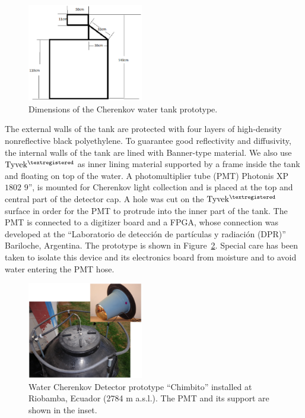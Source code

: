 \documentclass[12pt]{article}
\begin{document}
\begin{figure}[!ht]
  \centering
 \includegraphics[width=0.45\textwidth]{chimbito_dimensiones.eps}
  \caption{Dimensions of the Cherenkov water tank prototype.}
  \label{fig:tank}
 \end{figure}

The external walls of the tank are protected with four layers of
high-density nonreflective black polyethylene. To guarantee good
reflectivity and diffusivity, the internal walls of the tank are lined with
Banner-type material. We also use ${{\rm Tyvek^{\tiny \textregistered}}}$
as inner lining material supported by a frame inside the tank and floating
on top of the water. A photomultiplier tube (PMT) Photonis XP$1802$ $9$'',
is mounted for Cherenkov light collection and is placed at the top and
central part of the detector cap. A hole was cut on the ${{\rm Tyvek^{\tiny
      \textregistered}}}$ surface in order for the PMT to protrude into the inner part of the tank. The PMT is connected to a digitizer board and a FPGA, whose connection was developed at the ``Laboratorio de detecci\'on de part\'iculas y radiaci\'on (DPR)'' Bariloche, Argentina. The prototype is shown in Figure~\ref{fig:detector}. Special care has been taken to isolate this device and its electronics board from moisture and to avoid water entering the PMT hose. 

\begin{figure}[!ht]
  \centering
 \includegraphics[width=0.45\textwidth]{icrc2013-1208-01.eps}
  \caption{Water Cherenkov Detector prototype ``Chimbito'' installed at Riobamba, Ecuador (2784 m a.s.l.). The PMT and its support are shown in the inset.}
  \label{fig:detector}
 \end{figure}
\end{document}
